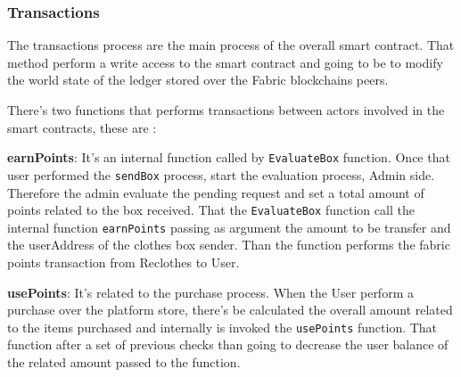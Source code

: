 \subsubsection{Transactions}

The transactions process are the main process of the overall smart contract. That method perform a
write access to the smart contract and going to be to modify the world state of the ledger
stored over the Fabric blockchains peers. 
\bigskip 

There's two functions that performs transactions between actors involved in the smart contracts,
these are :

\begin{outline}[enumerate]
    \1 \textbf{earnPoints}: It's an internal function called by \texttt{EvaluateBox} function.
    Once that user performed the \texttt{sendBox} process, start the evaluation process, Admin side.
    Therefore the admin evaluate the pending request and set a total amount of points related to 
    the box received. That the \texttt{EvaluateBox} function call the internal function \texttt{earnPoints}
     passing as argument the amount to be transfer and the userAddress of the clothes box sender. Than
     the function performs the fabric points transaction from Reclothes to User.
    
     \1 \textbf{usePoints}: It's related to the purchase process. When the User perform a purchase over
     the platform store, there's be calculated the overall amount related to the items purchased and internally
     is invoked the \texttt{usePoints} function. That function after a set of previous checks than going to 
     decrease the user balance of the related amount passed to the function.
\end{outline}

